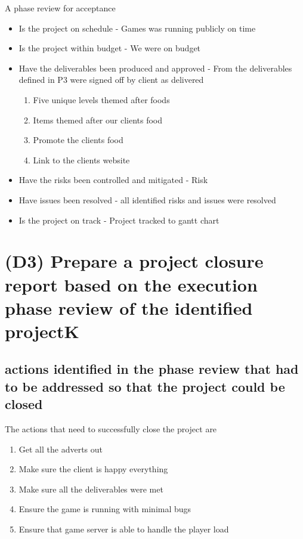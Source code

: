 \documentclass{article}
\begin{document}
A phase review for acceptance
\begin{itemize}
		\item Is the project on schedule - Games was running publicly  on time
		\item Is the project within budget - We were on budget
		\item Have the deliverables been produced and approved - From the deliverables defined in P3 were signed off by client as delivered
		\begin{enumerate}
			\item Five unique levels themed after foods
			\item Items themed after our clients food
			\item Promote the clients food
			\item Link to the clients website
		\end{enumerate}
		\item Have the risks been controlled and mitigated - Risk 
		\item Have issues been resolved - all identified risks and issues were resolved 
		\item Is the project on track - Project tracked to gantt chart
\end{itemize} 

\section{(D3) Prepare a project closure report based on the execution phase review of the identified projectK}

\subsection{actions identified in the phase review that had to be addressed so that the project could be closed}

The actions that need to successfully close the project are
\begin{enumerate}
	\item Get all the adverts out 
	\item Make sure the client is happy everything
	\item Make sure all the deliverables were met
	\item Ensure the game is running with minimal bugs
	\item Ensure that game server is able to handle the player load
\end{enumerate}
\end{document}
